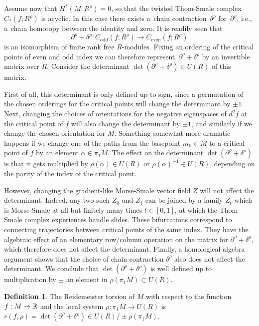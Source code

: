 \documentclass[11pt]{article}
\newcommand{\ie}{i.e.,\xspace}
\numberwithin{equation}{section}\providecommand{\dpl}{\displaystyle}
\theoremstyle{plain}
\theoremstyle{definition}
\newtheorem{definition}[theorem]{Definition}
\begin{document}
Assume now that $H^*(M ; R^\rho)=0$, so that the twisted Thom-Smale complex $C_*(f ; R^\rho)$ is acyclic. In this case there exists a~chain contraction~$\delta^\rho$ for~$\partial^\rho$, \ie a~chain homotopy between the identity and zero. It is readily seen that
\[
\partial^\rho+\delta^\rho : C_{\text{odd}} (f ;R^\rho) \to C_{\text{even}}(f ; R^\rho)
\]
is an isomorphism of finite rank free $R$\nobreakdash-modules. Fixing an ordering of the critical points of even and odd index we can therefore represent~$\partial^\rho+\delta^\rho$ by an invertible matrix over $R$. Consider the determinant $\det(\partial^\rho+\delta^\rho) \in U(R)$ of this matrix.

First of all, this determinant is only defined up to sign, since a permutation of the chosen orderings for the critical points will change the determinant by $\pm1 $. Next, changing the choices of orientations for the negative eigenspaces of $d^2f$ at the critical point of $f$ will also change the determinant by $\pm 1$, and similarly if we change the chosen orientation for $M$. Something somewhat more dramatic happens if we change one of the paths from the basepoint $m_0\in M$ to a critical point of $f$ by an element $\alpha \in \pi_1M$. The effect on the determinant $\det(\partial^\rho + \delta^\rho)$ is that it gets multiplied by $\rho(\alpha) \in U(R)$ or $\rho(\alpha)^{-1} \in U(R)$, depending on the parity of the index of the critical point.

However, changing the gradient-like Morse-Smale vector field $Z$ will not affect the determinant. Indeed, any two such $Z_0$ and $Z_1$ can be joined by a family $Z_t$ which is Morse-Smale at all but finitely many times $t \in [0,1]$, at which the Thom-Smale complex experiences handle slides. These bifurcations correspond to connecting trajectories between critical points of the same index. They have the algebraic effect of an elementary row/column operation on the matrix for $\partial^\rho+\delta^\rho$, which therefore does not affect the determinant. Finally, a homological algebra argument shows that the choice of chain contraction $\delta^\rho$ also does not affect the determinant. We conclude that $\det(\partial^\rho+\delta^\rho)$ is well defined up to multiplication by $\pm$ an element in $\rho(\pi_1M) \subset U(R)$.

\begin{definition}\label{reidemeisterdef}
The Reidemeister torsion of $M$ with respect to the function $f:M \to \mathbb{R}$ and the local system $\rho: \pi_1M \to U(R)$ is $r(f, \rho) = \det(\partial^\rho+\delta^\rho) \in U(R) / \pm \rho( \pi_1M )$.
\end{definition}
\end{document}
